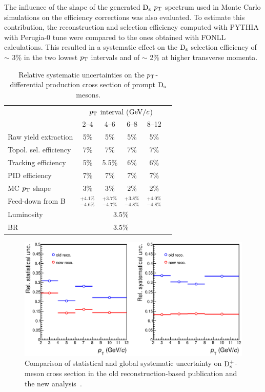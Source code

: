The influence of the shape of the generated ${\rm D_s}$ $p_{\rm T}$ spectrum used in 
Monte Carlo simulations on the efficiency corrections was also evaluated. 
To estimate this contribution, the reconstruction and selection 
efficiency computed with PYTHIA with Perugia-0 tune
were compared to the ones obtained with FONLL calculations. 
This resulted in a systematic effect on the ${\rm D_s}$ selection efficiency of $\sim$ 3\% 
in the two lowest $p_{\rm T}$ intervals and of $\sim$ 2\% at higher transverse momenta.\\

\begin{table}[!tb]
\centering
\begin{tabular}{l|ccccc}
 \hline 
 & \multicolumn{4}{c}{$p_{\rm T}$ interval ($\mathrm{GeV}/c$)}\\
 & 2--4 & 4--6 & 6--8 & 8--12\\
\hline
Raw yield extraction & 5\%& 5\%& 5\%& 5\%\\
Topol. sel. efficiency & 7\%& 7\%& 7\%& 7\%\\
Tracking efficiency & 5\%& 5.5\% & 6\% & 6\%\\
PID efficiency & 7\%& 7\%& 7\%& 7\%\\
MC $p_{\rm T}$ shape   &3\%&3\%&2\%&2\%\\
Feed-down from B & $^{+4.1\%}_{-4.6\%}$& $^{+3.7\%}_{-4.7\%}$& $^{+3.8\%}_{-4.8\%}$& $^{+4.0\%}_{-4.8\%}$\\
Luminosity  & \multicolumn{4}{c}{3.5\%} \\
BR  & \multicolumn{4}{c}{3.5\%} \\
\hline 
\end{tabular}
\caption{Relative systematic uncertainties on the $p_{\rm T}$-differential production
cross section of prompt ${\rm D_s}$ mesons.}
\label{tab:SystDs}
\end{table}

\begin{figure}[!h]
\begin{center}
\includegraphics[width=.99\textwidth]{FigCap4/uncertainties_pass2_pass4.eps}
\caption{Comparison of statistical and global systematic uncertainty on ${\rm D_s^+}$-meson
cross section in the old reconstruction-based publication and the new analysis~\cite{Acharya:2017jgo}.}
\label{fig:UncNewVsOld}
\end{center}
\end{figure}


